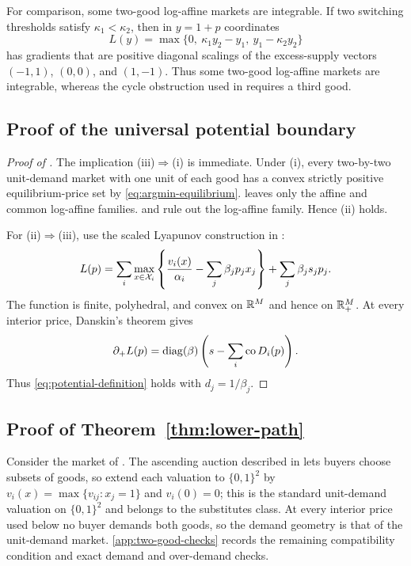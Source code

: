 For comparison, some two-good log-affine markets are integrable. If two switching thresholds satisfy $\kappa_1<\kappa_2$, then in $y=1+p$ coordinates
\[
L(y)=\max\{0,\ \kappa_1y_2-y_1,\ y_1-\kappa_2y_2\}
\]
has gradients that are positive diagonal scalings of the excess-supply vectors $(-1,1)$, $(0,0)$, and $(1,-1)$. Thus some two-good log-affine markets are integrable, whereas the cycle obstruction used in  requires a third good.

\subsection{Proof of the universal potential boundary}\label{subsec:potential-proof}

\begin{proof}[Proof of ]
The implication (iii)$\Rightarrow$(i) is immediate. Under (i), every two-by-two unit-demand market with one unit of each good has a convex strictly positive equilibrium-price set by \eqref{eq:argmin-equilibrium}.  leaves only the affine and common log-affine families.  and  rule out the log-affine family. Hence (ii) holds.

For (ii)$\Rightarrow$(iii), use the scaled Lyapunov construction in \citet[Theorem~6.4]{okisato2026}:
\begin{equation}\label{eq:affine-L}
L(p)=
\sum_i\max_{x\in\mathcal{X}_i}
\left\{\frac{v_i(x)}{\alpha_i}-\sum_j\beta_jp_jx_j\right\}
+\sum_j\beta_js_jp_j.
\end{equation}
The function is finite, polyhedral, and convex on $\mathbb{R}^M$ and hence on $\mathbb{R}_+^M$. At every interior price, Danskin's theorem gives
\[
\partial_+ L(p)=\operatorname{diag}(\beta)
\left(s-\sum_i\operatorname{co} D_i(p)\right).
\]
Thus \eqref{eq:potential-definition} holds with $d_j=1/\beta_j$.
\end{proof}

\subsection{Proof of Theorem~\ref{thm:lower-path}}\label{subsec:lower-path-proof}

Consider the market of . The ascending auction described in  lets buyers choose subsets of goods, so extend each valuation to $\{0,1\}^2$ by $v_i(x)=\max\{v_{ij}:x_j=1\}$ and $v_i(0)=0$; this is the standard unit-demand valuation on $\{0,1\}^2$ and belongs to the substitutes class. At every interior price used below no buyer demands both goods, so the demand geometry is that of the unit-demand market. \ref{app:two-good-checks} records the remaining compatibility condition and exact demand and over-demand checks.

